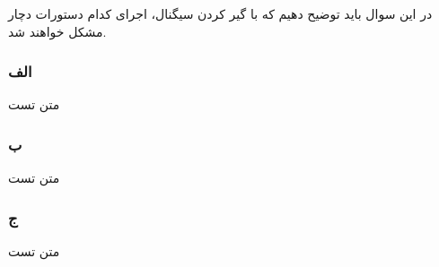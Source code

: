 در این سوال باید توضیح دهیم که با گیر کردن سیگنال، اجرای کدام دستورات دچار مشکل خواهند شد.


\subsubsection*{الف}
متن تست
\subsubsection*{ب}
متن تست
\subsubsection*{ج}
متن تست